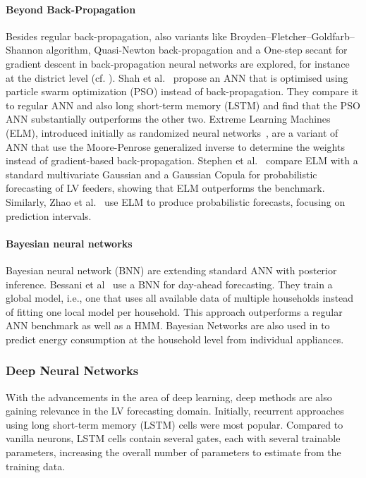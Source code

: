 \paragraph{Beyond Back-Propagation} Besides regular back-propagation, also variants like Broyden–Fletcher–Goldfarb–Shannon algorithm, Quasi-Newton back-propagation and a One-step secant for gradient descent in back-propagation neural networks are explored, for instance at the district level (cf. \cite{ahmad2019dlf}).
Shah et al.~\cite{shah2020stm} propose an ANN that is optimised using particle swarm optimization (PSO) instead of back-propagation. They compare it to regular ANN and also long short-term memory (LSTM) and find that the PSO ANN substantially outperforms the other two. Extreme Learning Machines (ELM), introduced initially as randomized neural networks~\cite{schmidt1992ffn}, are a variant of ANN that use the Moore-Penrose generalized inverse to determine the weights instead of gradient-based back-propagation. Stephen et al.~\cite{stephen2020ngr} compare ELM with a standard multivariate Gaussian and a Gaussian Copula for probabilistic forecasting of LV feeders, showing that ELM outperforms the benchmark. Similarly, Zhao et al.~\cite{zhao2020onp} use ELM to produce probabilistic forecasts, focusing on prediction intervals. 


\paragraph{Bayesian neural networks}
Bayesian neural network (BNN) are extending standard ANN with posterior inference. Bessani et al~\cite{bessani2020mhv} use a BNN for day-ahead forecasting. They train a global model, i.e., one that uses all available data of multiple households instead of fitting one local model per household. This approach outperforms a regular ANN benchmark as well as a HMM. Bayesian Networks are also used in \cite{Singh2018bdm} to predict energy consumption at the household level from individual appliances.


\subsubsection{Deep Neural Networks} \label{sec:deep_learning}

With the advancements in the area of deep learning, deep methods are also gaining relevance in the LV forecasting domain. Initially, recurrent approaches using long short-term memory (LSTM) cells were most popular. Compared to vanilla neurons, LSTM cells contain several gates, each with several trainable parameters, increasing the overall number of parameters to estimate from the training data. 

